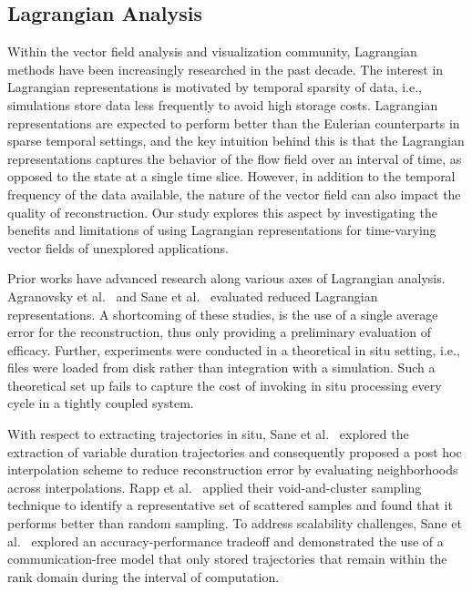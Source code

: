 \subsection{Lagrangian Analysis}
Within the vector field analysis and visualization community, Lagrangian methods have been increasingly researched in the past decade. 
%
The interest in Lagrangian representations is motivated by temporal sparsity of data, i.e., simulations store data less frequently to avoid high storage costs.
%
Lagrangian representations are expected to perform better than the Eulerian counterparts in sparse temporal settings, and the key intuition behind this is that the Lagrangian representations captures the behavior of the flow field over an interval of time, as opposed to the state at a single time slice.
%
However, in addition to the temporal frequency of the data available, the nature of the vector field can also impact the quality of reconstruction.
%
Our study explores this aspect by investigating the benefits and limitations of using Lagrangian representations for time-varying vector fields of unexplored applications.

Prior works have advanced research along various axes of Lagrangian analysis.
%
Agranovsky et al.~\cite{agranovsky2014improved} and Sane et al.~\cite{sane2018revisiting} evaluated reduced Lagrangian representations. 
%
A shortcoming of these studies, is the use of a single average error for the reconstruction, thus only providing a preliminary evaluation of efficacy. 
%
Further, experiments were conducted in a theoretical in situ setting, i.e., files were loaded from disk rather than integration with a simulation. 
%
Such a theoretical set up fails to capture the cost of invoking in situ processing every cycle in a tightly coupled system.
%
%
%

With respect to extracting trajectories in situ, Sane et al.~\cite{sane2019interpolation} explored the extraction of variable duration trajectories and consequently proposed a post hoc interpolation scheme to reduce reconstruction error by evaluating neighborhoods across interpolations.
%
Rapp et al.~\cite{rapp2019void} applied their void-and-cluster sampling technique to identify a representative set of scattered samples and found that it performs better than random sampling.
%
To address scalability challenges, Sane et al.~\cite{sane2020scalable} explored an accuracy-performance tradeoff and demonstrated the use of a communication-free model that only stored trajectories that remain within the rank domain during the interval of computation.
%

